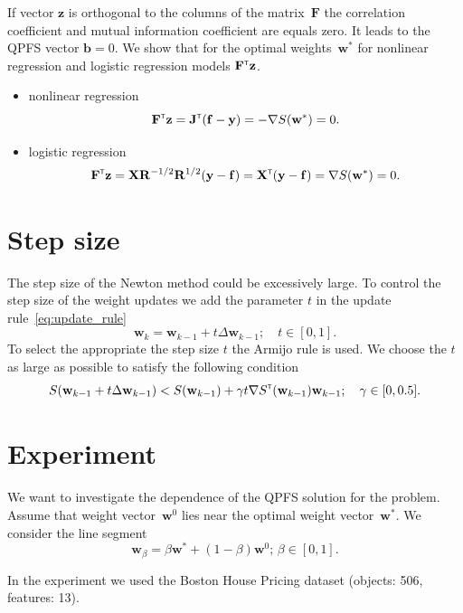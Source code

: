 \documentclass[a4paper,12pt]{article}
\theoremstyle{plain} %
\theoremstyle{definition} %
\theoremstyle{remark} %
\newcommand{\bb}{\mathbf{b}}
\newcommand{\bw}{\mathbf{w}}
\newcommand{\by}{\mathbf{y}}
\newcommand{\bz}{\mathbf{z}}
\newcommand{\bJ}{\mathbf{J}}
\newcommand{\bF}{\mathbf{F}}
\newcommand{\bR}{\mathbf{R}}
\newcommand{\bX}{\mathbf{X}}
\newcommand{\T}{{\text{\tiny\sffamily\upshape\mdseries T}}}
\begin{document}
  	If vector $\bz$ is orthogonal to the columns of the matrix~$\bF$ the correlation coefficient and mutual information coefficient are equals zero. It leads to the QPFS vector $\bb = 0$.
	We show that for the optimal weights~$\bw^*$ for nonlinear regression and logistic regression models $\bF^{\T} \bz$.
	\begin{itemize}
	\item nonlinear regression
	\[
		\bF^{\T} \bz = \bJ^{\T} (\mathbf{f} - \by) = - \nabla S(\bw^*) = 0.
	\]
	\item logistic regression
	\[
		\bF^{\T} \bz = \bX \bR^{-1/2} \bR^{1/2} (\by - \mathbf{f}) = \bX^{\T} (\by - \mathbf{f}) = \nabla S(\bw^*) = 0.
	\]
	\end{itemize}

	\section*{Step size}
	
	The step size of the Newton method could be excessively large. To control the step size of the weight updates we add the parameter $t$ in the update rule~\eqref{eq:update_rule}
	\[
		\bw_k = \bw_{k - 1} + t \Delta \bw_{k - 1}; \quad t \in [0, 1].
	\]
	To select the appropriate the step size $t$ the Armijo rule is used. We choose the $t$ as large as possible to satisfy the following condition
	\[
		S(\bw_{k - 1} + t \Delta \bw_{k - 1}) < S(\bw_{k - 1}) + \gamma t \nabla S^{\T}(\bw_{k-1})\bw_{k - 1}; \quad \gamma \in [0, 0.5].
	\]
	
  	\section*{Experiment}
  	
  	We want to investigate the dependence of the QPFS solution for the problem. 
  	Assume that weight vector~$\bw^0$ lies near the optimal weight vector~$\bw^*$. 
  	We consider the line segment
  	\[
  	\bw_{\beta} = \beta \bw^* + (1 - \beta) \bw^0; \, \beta \in [0, 1] .
  	\]
  	
  	In the experiment we used the Boston House Pricing dataset (objects: 506, features: 13). 
\end{document}
